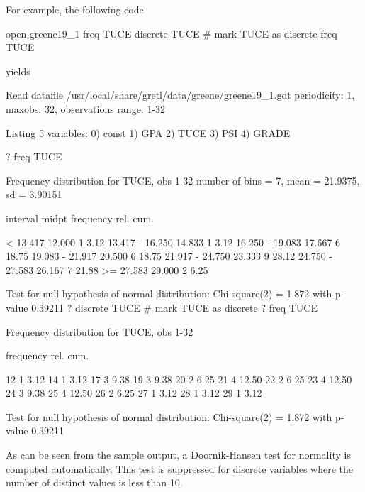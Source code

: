 For example, the following code
%
\begin{code}
open greene19_1
freq TUCE
discrete TUCE # mark TUCE as discrete
freq TUCE
\end{code}
%
yields
%
\begin{code}
Read datafile /usr/local/share/gretl/data/greene/greene19_1.gdt
periodicity: 1, maxobs: 32,
observations range: 1-32

Listing 5 variables:
  0) const    1) GPA      2) TUCE     3) PSI      4) GRADE  

? freq TUCE

Frequency distribution for TUCE, obs 1-32
number of bins = 7, mean = 21.9375, sd = 3.90151

       interval          midpt   frequency    rel.     cum.

          <  13.417     12.000        1      3.12%
    13.417 - 16.250     14.833        1      3.12%
    16.250 - 19.083     17.667        6     18.75%
    19.083 - 21.917     20.500        6     18.75%
    21.917 - 24.750     23.333        9     28.12%
    24.750 - 27.583     26.167        7     21.88%
          >= 27.583     29.000        2      6.25%

Test for null hypothesis of normal distribution:
Chi-square(2) = 1.872 with p-value 0.39211
? discrete TUCE # mark TUCE as discrete
? freq TUCE

Frequency distribution for TUCE, obs 1-32

          frequency    rel.     cum.

  12           1      3.12%
  14           1      3.12%
  17           3      9.38%
  19           3      9.38%
  20           2      6.25%
  21           4     12.50%
  22           2      6.25%
  23           4     12.50%
  24           3      9.38%
  25           4     12.50%
  26           2      6.25%
  27           1      3.12%
  28           1      3.12%
  29           1      3.12%

Test for null hypothesis of normal distribution:
Chi-square(2) = 1.872 with p-value 0.39211
\end{code}
%
As can be seen from the sample output, a Doornik-Hansen test for
normality is computed automatically.  This test is suppressed for
discrete variables where the number of distinct values is less than
10.

